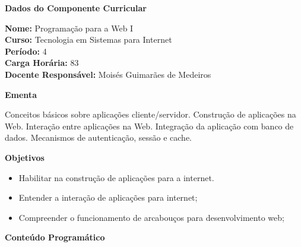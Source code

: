 

\begin{snugshade}\begin{center}\textbf{
    Dados do Componente Curricular
}\end{center}\end{snugshade}

\noindent \textbf{Nome:}                Programação para a Web I
\\        \textbf{Curso:}               Tecnologia em Sistemas para Internet
\\        \textbf{Período:}             \unit{4}{\degree}
\\        \textbf{Carga Horária:}       \unit{83}{\hour}
\\        \textbf{Docente Responsável:} Moisés Guimarães de Medeiros


\begin{snugshade}\begin{center}\textbf{
    Ementa
\vphantom{q}}\end{center}\end{snugshade}

\noindent
Conceitos básicos sobre aplicações cliente/servidor. Construção de aplicações na Web. Interação entre aplicações na Web. Integração da aplicação com banco de dados. Mecanismos de autenticação, sessão e cache. 

\begin{snugshade}\begin{center}\textbf{
    Objetivos
}\end{center}\end{snugshade}

\begin{itemize}

\item Habilitar na construção de aplicações para a internet.

\item Entender a interação de aplicações para internet;

\item Compreender o funcionamento de arcabouços para desenvolvimento web;

\end{itemize} 


\begin{snugshade}\begin{center}\textbf{
    Conteúdo Programático
}\end{center}\end{snugshade}

